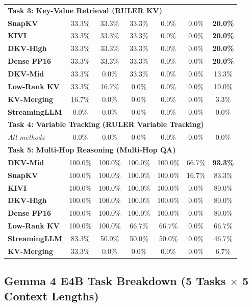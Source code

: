 \documentclass[10pt]{article}
\theoremstyle{definition}
\begin{document}
\begin{table}[h]
\begin{tabular}{lcccccc}
\midrule
\multicolumn{7}{l}{\textbf{Task 3: Key-Value Retrieval (RULER KV)}} \\
\textbf{SnapKV} & 33.3\% & 33.3\% & 33.3\% & 0.0\% & 0.0\% & \textbf{20.0\%} \\
\textbf{KIVI} & 33.3\% & 33.3\% & 33.3\% & 0.0\% & 0.0\% & \textbf{20.0\%} \\
\textbf{DKV-High} & 33.3\% & 33.3\% & 33.3\% & 0.0\% & 0.0\% & \textbf{20.0\%} \\
\textbf{Dense FP16} & 33.3\% & 33.3\% & 33.3\% & 0.0\% & 0.0\% & \textbf{20.0\%} \\
\textbf{DKV-Mid} & 33.3\% & 0.0\% & 33.3\% & 0.0\% & 0.0\% & 13.3\% \\
\textbf{Low-Rank KV} & 33.3\% & 16.7\% & 0.0\% & 0.0\% & 0.0\% & 10.0\% \\
\textbf{KV-Merging} & 16.7\% & 0.0\% & 0.0\% & 0.0\% & 0.0\% & 3.3\% \\
\textbf{StreamingLLM} & 0.0\% & 0.0\% & 0.0\% & 0.0\% & 0.0\% & 0.0\% \\
\midrule
\multicolumn{7}{l}{\textbf{Task 4: Variable Tracking (RULER Variable Tracking)}} \\
\textit{All methods} & 0.0\% & 0.0\% & 0.0\% & 0.0\% & 0.0\% & 0.0\% \\
\midrule
\multicolumn{7}{l}{\textbf{Task 5: Multi-Hop Reasoning (Multi-Hop QA)}} \\
\textbf{DKV-Mid} & 100.0\% & 100.0\% & 100.0\% & 100.0\% & 66.7\% & \textbf{93.3\%} \\
\textbf{SnapKV} & 100.0\% & 100.0\% & 100.0\% & 100.0\% & 16.7\% & 83.3\% \\
\textbf{KIVI} & 100.0\% & 100.0\% & 100.0\% & 100.0\% & 0.0\% & 80.0\% \\
\textbf{DKV-High} & 100.0\% & 100.0\% & 100.0\% & 100.0\% & 0.0\% & 80.0\% \\
\textbf{Dense FP16} & 100.0\% & 100.0\% & 100.0\% & 100.0\% & 0.0\% & 80.0\% \\
\textbf{Low-Rank KV} & 100.0\% & 100.0\% & 66.7\% & 66.7\% & 0.0\% & 66.7\% \\
\textbf{StreamingLLM} & 83.3\% & 50.0\% & 50.0\% & 50.0\% & 0.0\% & 46.7\% \\
\textbf{KV-Merging} & 33.3\% & 0.0\% & 0.0\% & 0.0\% & 0.0\% & 6.7\% \\
\bottomrule
\end{tabular}
\end{table}

\clearpage
\subsection{Gemma 4 E4B Task Breakdown (5 Tasks \texorpdfstring{$\times$}{x} 5 Context Lengths)}
\end{document}
